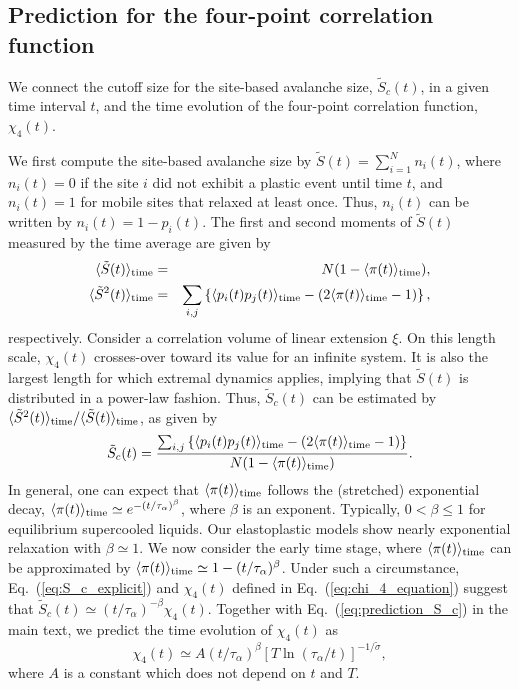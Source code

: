 \documentclass[pre,twocolumn,superscriptaddress,tightenlines,showpacs,longbibliography,floatfix,footinbib]{revtex4-1}
\begin{document}
\subsection{Prediction for the four-point correlation function}

We connect the cutoff size for the site-based avalanche size, $\tilde S_c(t)$, in a given time interval $t$, and the time evolution of the four-point correlation function, $\chi_4(t)$.

We first compute the site-based avalanche size by $\tilde S(t) = \sum_{i=1}^{N} n_i(t)$, where
$n_i(t)=0$ if the site $i$ did not exhibit a plastic event until time $t$, and $n_i(t)=1$ for mobile sites that relaxed at least once. Thus, $n_i(t)$ can be written by $n_i(t)=1-p_i(t)$.
The first and second moments of $\tilde S(t)$ measured by the time average are given by
\begin{eqnarray}
    \langle \tilde S(t) \rangle_{\rm time} &=& N(1-\langle \pi(t) \rangle_{\rm time}), \nonumber \\
    \langle \tilde S^2(t) \rangle_{\rm time} &=& \sum_{i,j} \left\{ \langle p_i(t) p_j(t) \rangle_{\rm time} -(2\langle \pi(t) \rangle_{\rm time}-1) \right\}, \nonumber
\end{eqnarray}
respectively.
Consider a correlation volume of linear extension $\xi$. On this  length scale,  $\chi_4(t)$ crosses-over toward its value for an infinite system. It is also the largest length  for which extremal dynamics applies, implying that $\tilde S(t)$ is distributed in a power-law fashion. Thus, $\tilde S_c(t)$ can be estimated by $\langle \tilde S^2(t) \rangle_{\rm time}/\langle \tilde S(t) \rangle_{\rm time}$, as given by
\begin{equation}
    \tilde S_c(t) = \frac{\sum_{i,j} \left\{ \langle p_i(t) p_j(t) \rangle_{\rm time} -(2\langle \pi(t) \rangle_{\rm time}-1) \right\}}{N(1-\langle \pi(t) \rangle_{\rm time})}
.
\label{eq:S_c_explicit}
\end{equation}
In general, one can expect that
$\langle \pi(t) \rangle_{\rm time}$ follows the (stretched) exponential decay,
$\langle \pi(t) \rangle_{\rm time} \simeq e^{-(t/\tau_\alpha)^\beta}$, where $\beta$ is an exponent. Typically, $0<\beta \leq 1$ for equilibrium supercooled liquids.
Our elastoplastic models show nearly exponential relaxation with $\beta \simeq 1$. 
We now consider the early time stage, where $\langle \pi(t) \rangle_{\rm time}$ can be approximated by
$\langle \pi(t) \rangle_{\rm time} \simeq 1 -(t/\tau_\alpha)^\beta$.
Under such a circumstance, Eq.~(\ref{eq:S_c_explicit}) and $\chi_4(t)$ defined in
Eq.~(\ref{eq:chi_4_equation})  suggest that
$\tilde S_c(t) \simeq (t/\tau_\alpha)^{-\beta} \chi_4(t)$.
Together with Eq.~(\ref{eq:prediction_S_c}) in the main text, we predict the time evolution of $\chi_4(t)$ as
\begin{equation}
    \chi_4(t) \simeq A(t/\tau_\alpha)^{\beta} \left[ T \ln(\tau_\alpha/t) \right]^{-1/\tilde \sigma},
    \label{eq:chi4_prediction}
\end{equation}
where $A$ is a constant which does not depend on $t$ and $T$.
\end{document}
